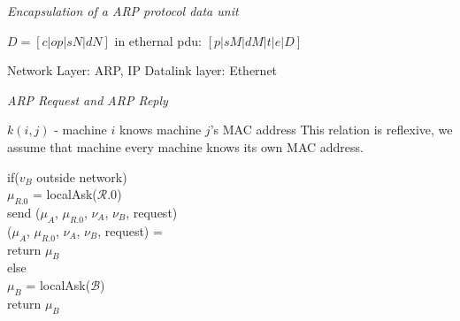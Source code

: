 \frmrule 

\textit{Encapsulation of a ARP protocol data unit}


$D = [c | op | sN | dN]$ in ethernal pdu: $[p|sM|dM|t|e|D]$


Network Layer: ARP, IP
Datalink layer: Ethernet 

\frmrule 

\textit{ARP Request and ARP Reply}



$k(i,j)$ - machine $i$ knows machine $j$'s MAC address
This relation is reflexive, we assume that machine every machine knows its own MAC address.

if($v_B$ outside network) \\
$\mu_{R.0}$ = localAsk($\mathcal{R}.0$) \\
send ($\mu_{A}$, $\mu_{R.0}$, $\nu_{A}$, $\nu_{B}$, \textsf{request})\\
($\mu_{A}$, $\mu_{R.0}$, $\nu_{A}$, $\nu_{B}$, \textsf{request}) = \\
return $\mu_{B}$\\
else \\
$\mu_{B}$ = localAsk($\mathcal{B}$) \\
return $\mu_{B}$\\

\frmrule 

